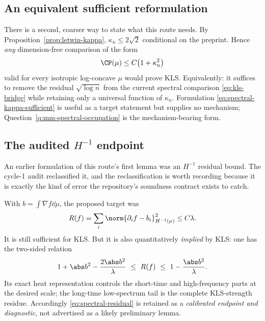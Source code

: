 \documentclass[../../main.tex]{subfiles}
\begin{document}
\subsection{An equivalent sufficient reformulation}
\label{subsec:spectral-kappa-form}

There is a second, coarser way to state what this route needs. By
Proposition~\ref{prop:letwin-kappa}, $\kappa_n\le2\sqrt2$ conditional on the preprint. Hence
\emph{any} dimension-free comparison of the form
\begin{equation}
  \CP(\mu)\le C\bigl(1+\kappa_n^2\bigr)
  \label{eq:spectral-kappa-sufficient}
\end{equation}
valid for every isotropic log-concave $\mu$ would prove KLS. Equivalently: it suffices to remove
the residual $\sqrt{\log n}$ from the current spectral comparison \eqref{eq:kls-bridge} while
retaining only a universal function of $\kappa_n$. Formulation
\eqref{eq:spectral-kappa-sufficient} is useful as a target statement but supplies no mechanism;
Question~\ref{q:mm-spectral-occupation} is the mechanism-bearing form.

\subsection{The audited \texorpdfstring{$H^{-1}$}{H-1} endpoint}
\label{subsec:spectral-h-minus-one}
\label{subsec:spectral-hminus1-endpoint}

An earlier formulation of this route's first lemma was an $H^{-1}$ residual bound. The cycle-1
audit reclassified it, and the reclassification is worth recording because it is exactly the kind
of error the repository's soundness contract exists to catch.

With $b=\int\nabla f\dd\mu$, the proposed target was
\begin{equation}
  R(f)=\sum_i\norm{\partial_if-b_i}_{H^{-1}(\mu)}^2\le C\lambda .
  \label{eq:spectral-residual}
\end{equation}
It is still sufficient for KLS. But it is also quantitatively \emph{implied} by KLS: one has the
two-sided relation
\begin{equation}
  1+\abs b^2-\frac{2\abs b^2}\lambda\ \le\ R(f)\ \le\ 1-\frac{\abs b^2}\lambda .
  \label{eq:spectral-residual-two-sided}
\end{equation}
Its exact heat representation controls the short-time and high-frequency parts at the desired
scale; the long-time low-spectrum tail is the complete KLS-strength residue. Accordingly
\eqref{eq:spectral-residual} is retained as a \emph{calibrated endpoint and diagnostic}, not
advertised as a likely preliminary lemma.
\end{document}
